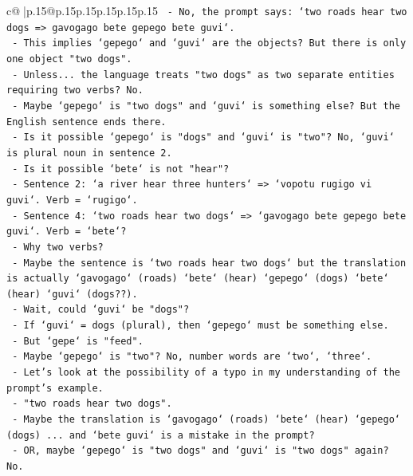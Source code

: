\documentclass{article}
\begin{document}
{\begin{supertabular}{c@{$\;$}|p{.15\linewidth}@{}p{.15\linewidth}p{.15\linewidth}p{.15\linewidth}p{.15\linewidth}p{.15\linewidth}}
{{{\texttt{                 {-} No, the prompt says: `two roads hear two dogs => gavogago bete gepego bete guvi`.} \\
\texttt{                 {-} This implies `gepego` and `guvi` are the objects? But there is only one object "two dogs".} \\
\texttt{                 {-} Unless... the language treats "two dogs" as two separate entities requiring two verbs? No.} \\
\texttt{                 {-} Maybe `gepego` is "two dogs" and `guvi` is something else? But the English sentence ends there.} \\
\texttt{                 {-} Is it possible `gepego` is "dogs" and `guvi` is "two"? No, `guvi` is plural noun in sentence 2.} \\
\texttt{                 {-} Is it possible `bete` is not "hear"?} \\
\texttt{                   {-} Sentence 2: `a river hear three hunters` => `vopotu rugigo vi guvi`. Verb = `rugigo`.} \\
\texttt{                   {-} Sentence 4: `two roads hear two dogs` => `gavogago bete gepego bete guvi`. Verb = `bete`?} \\
\texttt{                   {-} Why two verbs?} \\
\texttt{                   {-} Maybe the sentence is `two roads hear two dogs` but the translation is actually `gavogago` (roads) `bete` (hear) `gepego` (dogs) `bete` (hear) `guvi` (dogs??).} \\
\texttt{                   {-} Wait, could `guvi` be "dogs"?} \\
\texttt{                     {-} If `guvi` = dogs (plural), then `gepego` must be something else.} \\
\texttt{                     {-} But `gepe` is "feed".} \\
\texttt{                     {-} Maybe `gepego` is "two"? No, number words are `two`, `three`.} \\
\texttt{                 {-} Let's look at the possibility of a typo in my understanding of the prompt's example.} \\
\texttt{                 {-} "two roads hear two dogs".} \\
\texttt{                 {-} Maybe the translation is `gavogago` (roads) `bete` (hear) `gepego` (dogs) ... and `bete guvi` is a mistake in the prompt?} \\
\texttt{                 {-} OR, maybe `gepego` is "two dogs" and `guvi` is "two dogs" again? No.} \\
}}}
\end{supertabular}}
\end{document}

